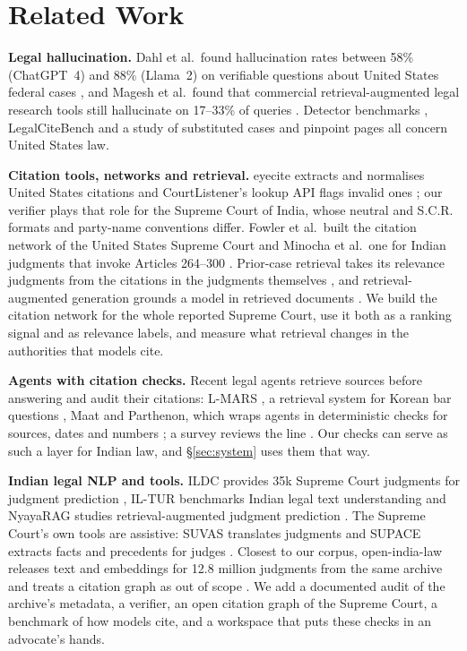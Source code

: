 \documentclass[conference]{IEEEtran}
\begin{document}


\section{Related Work}
\textbf{Legal hallucination.} Dahl et al.\ found hallucination rates between 58\% (ChatGPT~4) and 88\% (Llama~2) on verifiable questions about United States federal cases \cite{dahl2024}, and Magesh et al.\ found that commercial retrieval-augmented legal research tools still hallucinate on 17--33\% of queries \cite{magesh2025}. Detector benchmarks \cite{liu2026checks}, LegalCiteBench \cite{legalcitebench} and a study of substituted cases and pinpoint pages \cite{verma2026} all concern United States law.

\textbf{Citation tools, networks and retrieval.} eyecite extracts and normalises United States citations \cite{eyecite} and CourtListener's lookup API flags invalid ones \cite{courtlistenerapi}; our verifier plays that role for the Supreme Court of India, whose neutral and S.C.R. formats and party-name conventions differ. Fowler et al.\ built the citation network of the United States Supreme Court \cite{fowler2007} and Minocha et al.\ one for Indian judgments that invoke Articles 264--300 \cite{minocha2015}. Prior-case retrieval takes its relevance judgments from the citations in the judgments themselves \cite{joshi2023ucreat,farber2020}, and retrieval-augmented generation grounds a model in retrieved documents \cite{lewis2020rag}. We build the citation network for the whole reported Supreme Court, use it both as a ranking signal and as relevance labels, and measure what retrieval changes in the authorities that models cite.

\textbf{Agents with citation checks.} Recent legal agents retrieve sources before answering and audit their citations: L-MARS \cite{lmars}, a retrieval system for Korean bar questions \cite{koreanrag}, Maat \cite{maat} and Parthenon, which wraps agents in deterministic checks for sources, dates and numbers \cite{parthenon}; a survey reviews the line \cite{liu2026survey}. Our checks can serve as such a layer for Indian law, and \S\ref{sec:system} uses them that way.

\textbf{Indian legal NLP and tools.} ILDC provides 35k Supreme Court judgments for judgment prediction \cite{ildc}, IL-TUR benchmarks Indian legal text understanding \cite{iltur} and NyayaRAG studies retrieval-augmented judgment prediction \cite{nyayarag}. The Supreme Court's own tools are assistive: SUVAS translates judgments and SUPACE extracts facts and precedents for judges \cite{suvas,supace}. Closest to our corpus, open-india-law releases text and embeddings for 12.8 million judgments from the same archive and treats a citation graph as out of scope \cite{openindialaw}. We add a documented audit of the archive's metadata, a verifier, an open citation graph of the Supreme Court, a benchmark of how models cite, and a workspace that puts these checks in an advocate's hands.
\end{document}
